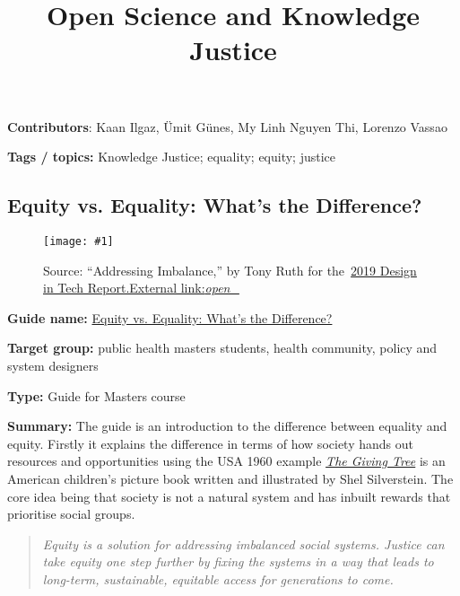 \documentclass{article}
\newlength{\imgwidth}
\newcommand\scaledgraphics[2]{%
                
\settowidth{\imgwidth}{\texttt{[image: \#1]}}%
                
\setlength{\imgwidth}{\minof{\imgwidth}{#2\textwidth}}%
                
\texttt{[image: \#1]}%
                
}
\begin{document}
\title{Open Science and Knowledge Justice}

\maketitle


\textbf{Contributors}: Kaan Ilgaz, Ümit Günes, My Linh Nguyen Thi, Lorenzo Vassao


\textbf{Tags / topics:} Knowledge Justice; equality; equity; justice


\subsection{Equity vs. Equality: What’s the Difference?}\label{H7912011}



\begin{center}
\begin{figure}
\scaledgraphics{f0cce63a-bf54-49fe-bc74-0291d6668193.png}{0.75}
\caption*{Source: “Addressing Imbalance,” by Tony Ruth for the \href{https://designintech.report/2019/03/11/%F0%9F%93%B1design-in-tech-report-2019-section-6-addressing-imbalance/}{2019 Design in Tech Report.External link:}\emph{\href{https://designintech.report/2019/03/11/%F0%9F%93%B1design-in-tech-report-2019-section-6-addressing-imbalance/}{open\_}}}\label{F24704971}
\end{figure}


\end{center}


\textbf{Guide name: }\href{https://onlinepublichealth.gwu.edu/resources/equity-vs-equality/}{Equity vs. Equality: What’s the Difference?} \autocite{mphgw_the_george_washington_university_equity_2020}


\textbf{Target group: }public health masters students, health community, policy and system designers


\textbf{Type:} Guide for Masters course


\textbf{Summary: }The guide is an introduction to the difference between equality and equity. Firstly it explains the difference in terms of how society hands out resources and opportunities using the USA 1960 example \emph{\href{https://en.wikipedia.org/wiki/The_Giving_Tree}{The Giving Tree}} is an American children's picture book written and illustrated by Shel Silverstein. The core idea being that society is not a natural system and has inbuilt rewards that prioritise social groups.

\begin{quote}



\emph{Equity is a solution for addressing imbalanced social systems. Justice can take equity one step further by fixing the systems in a way that leads to long-term, sustainable, equitable access for generations to come.}


\end{quote}
\end{document}
